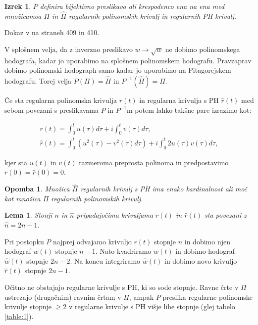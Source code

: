 \documentclass[a4paper]{IEEEtran}
\newtheorem{theorem}{Izrek}
\newtheorem{remark}{Opomba}
\newtheorem{lemma}{Lema}
\begin{document}
	\begin{theorem}
	$P$ definira bijektivno preslikavo ali krespodenco ena na ena med množicamoa $\Pi$ in $\hat{\Pi}$ ragularnih polinomskih krivulj in regularnih PH krivulj.
	\end{theorem}
	
	\proof
	Dokaz v \cite{knjiga} na straneh 409 in 410.
	\endproof
	
	V splošnem velja, da z inverzno preslikavo $w \rightarrow \sqrt{w}$ ne  dobimo polinomskega hodografa, kadar jo uporabimo na splošnem polinomskem hodografu. Pravzaprav dobimo polinomski hodograph samo kadar jo uporabimo na Pitagorejskem hodografu. Torej velja $P(\Pi) = \hat{\Pi}$ in $P^{-1}(\hat{\Pi}) = \Pi$.
	
	Če sta regularna polinomska krivulja $r(t)$ in regularna krivulja s PH $\hat{r}(t)$ med sebom povezani s preslikavama $P$ in $P^{-1}$m potem lahko takšne pare izrazimo kot:
	
	\begin{eqnarray}\label{eq:6}
	r(t) = \int_0^t u( \tau ) d \tau + i \int_0^t v( \tau ) d \tau , \nonumber \\
	\hat{r}(t) = \int_0^t (u^2( \tau ) - v^2( \tau ) d \tau ) + i \int_0^t 2 u( \tau ) v( \tau ) d \tau ,
	\end{eqnarray}	
	
	kjer sta $u(t)$ in $v(t)$ razmeroma preprosta polinoma in predpostavimo $r(0) = \hat{r}(0) = 0$.
	
	\begin{remark}
	Množica $\hat{\Pi}$ regularnih krivulj s PH ima enako kardinalnost ali moč kot množica $\Pi$ regularnih polinomskih krivulj.
	\end{remark}
	
	\begin{lemma}
	Stonji $n$ in $\hat{n}$ pripadajočima krivuljama $r(t)$ in $\hat{r}(t)$ sta povezani z $\hat{n}=2n-1$.
	\end{lemma}
	
	\proof
	Pri postopku $P$ najprej odvajamo krivuljo $r(t)$ stopnje $n$ in dobimo njen hodograf $w(t)$ stopnje $n-1$. Nato kvadriramo $w(t)$  in dobimo hodograf $\hat{w}(t)$ stopnje $2n-2$. Na koncu integriramo $\hat{w}(t)$ in dobimo novo krivuljo $\hat{r}(t)$ stopnje $2n-1$.
	\endproof
	
	Očitno ne obstajajo  regularne krivulje s PH, ki so sode stopnje. Ravne črte v $\Pi$ ustrezajo (drugačnim) ravnim črtam v $\hat{\Pi}$, ampak $P$ preslika regularne polinomske krivulje stopnje $\geq 2$ v regularne krivulje s PH višje lihe stopnje (glej tabelo \ref{table:1}).
	
\end{document}
